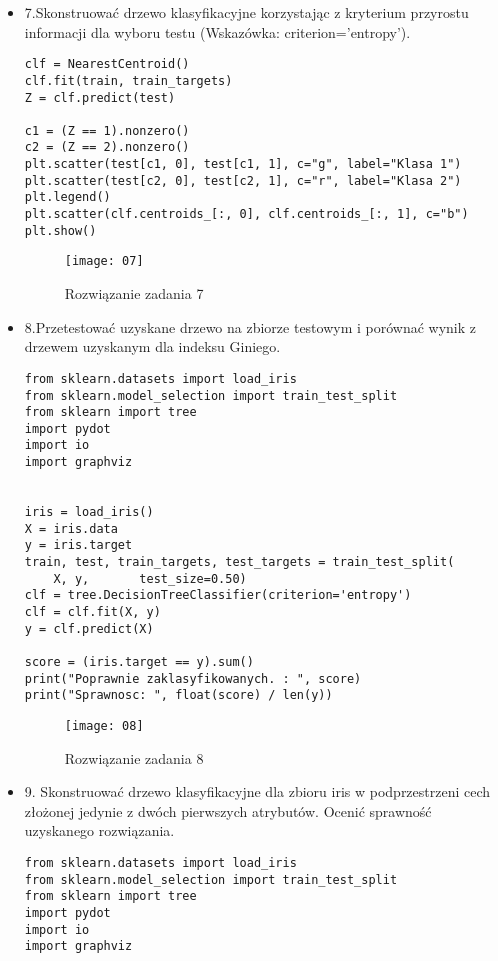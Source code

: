 \documentclass[12pt,a4paper]{article}
\begin{document}
\begin{itemize}
                        \item 7.Skonstruować drzewo klasyfikacyjne korzystając z kryterium przyrostu informacji dla wyboru testu (Wskazówka: criterion=’entropy’).
	\begin{lstlisting}
clf = NearestCentroid()
clf.fit(train, train_targets)
Z = clf.predict(test)

c1 = (Z == 1).nonzero()
c2 = (Z == 2).nonzero()
plt.scatter(test[c1, 0], test[c1, 1], c="g", label="Klasa 1")
plt.scatter(test[c2, 0], test[c2, 1], c="r", label="Klasa 2")
plt.legend()
plt.scatter(clf.centroids_[:, 0], clf.centroids_[:, 1], c="b")
plt.show()
	\end{lstlisting}
		\begin{figure}[h]
                        \texttt{[image: 07]}
                        \centering
			\caption{Rozwiązanie zadania 7}
			\label{fig:fig7}
                \end{figure}
                \clearpage

                \item 8.Przetestować uzyskane drzewo na zbiorze testowym i porównać wynik z drzewem uzyskanym dla indeksu Giniego.
	\begin{lstlisting}
from sklearn.datasets import load_iris
from sklearn.model_selection import train_test_split
from sklearn import tree
import pydot
import io
import graphviz


iris = load_iris()
X = iris.data
y = iris.target
train, test, train_targets, test_targets = train_test_split(
    X, y,       test_size=0.50)
clf = tree.DecisionTreeClassifier(criterion='entropy')
clf = clf.fit(X, y)
y = clf.predict(X)

score = (iris.target == y).sum()
print("Poprawnie zaklasyfikowanych. : ", score)
print("Sprawnosc: ", float(score) / len(y))

	\end{lstlisting}
		\begin{figure}[h]
                        \texttt{[image: 08]}
                        \centering
			\caption{Rozwiązanie zadania 8}
			\label{fig:fig8}
                \end{figure}
                \clearpage
                \item 9. Skonstruować drzewo klasyfikacyjne dla zbioru iris w podprzestrzeni cech złożonej jedynie z dwóch pierwszych atrybutów. Ocenić sprawność uzyskanego rozwiązania.
	\begin{lstlisting}
from sklearn.datasets import load_iris
from sklearn.model_selection import train_test_split
from sklearn import tree
import pydot
import io
import graphviz



\end{lstlisting}
\end{itemize}
\end{document}
